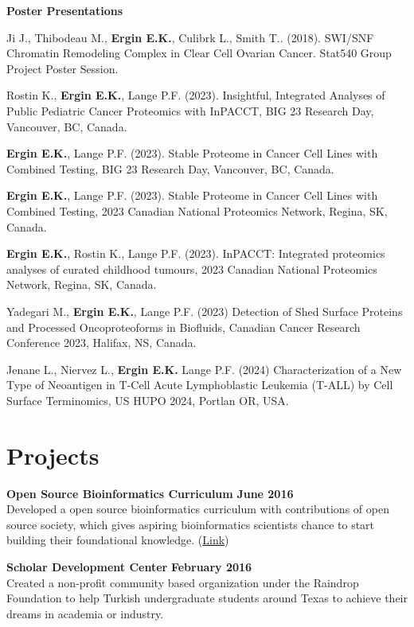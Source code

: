 \documentclass[margin,line]{res}
\begin{document}
\begin{resume}
{\bf Poster Presentations}

\vspace{-.3cm}
Ji J., Thibodeau M., {\bf Ergin E.K.}, Culibrk L., Smith T.. (2018). SWI/SNF Chromatin Remodeling Complex in Clear Cell Ovarian Cancer. Stat540 Group Project Poster Session.

Rostin K., {\bf Ergin E.K.}, Lange P.F. (2023). Insightful, Integrated Analyses of Public Pediatric Cancer Proteomics with InPACCT, BIG 23 Research Day, Vancouver, BC, Canada.

{\bf Ergin E.K.}, Lange P.F. (2023). Stable Proteome in Cancer Cell Lines with Combined Testing, BIG 23 Research Day, Vancouver, BC, Canada.

{\bf Ergin E.K.}, Lange P.F. (2023). Stable Proteome in Cancer Cell Lines with Combined Testing, 2023 Canadian National Proteomics Network, Regina, SK, Canada.

{\bf Ergin E.K.}, Rostin K., Lange P.F. (2023). InPACCT: Integrated proteomics analyses of curated childhood tumours, 2023 Canadian National Proteomics Network, Regina, SK, Canada.

Yadegari M., {\bf Ergin E.K.}, Lange P.F. (2023) Detection of Shed Surface Proteins and Processed Oncoproteoforms in Biofluids, Canadian Cancer Research Conference 2023, Halifax, NS, Canada.

Jenane L., Niervez L., {\bf Ergin E.K.} Lange P.F. (2024) Characterization of a New Type of Neoantigen in T-Cell Acute Lymphoblastic Leukemia (T-ALL) by Cell Surface Terminomics, US HUPO 2024, Portlan OR, USA.


\section{\sc Projects}


{\bf Open Source Bioinformatics Curriculum} \hfill {\bf June  2016}\\
Developed a open source bioinformatics curriculum with contributions of open source society, which gives aspiring bioinformatics scientists chance to start building their foundational knowledge. (\href{https://github.com/open-source-society/bioinformatics}{Link})

{\bf Scholar Development Center} \hfill {\bf February  2016}\\
Created a non-profit community based organization under the Raindrop Foundation to help Turkish undergraduate students around Texas to achieve their dreams in academia or industry.


\end{resume}
\end{document}
